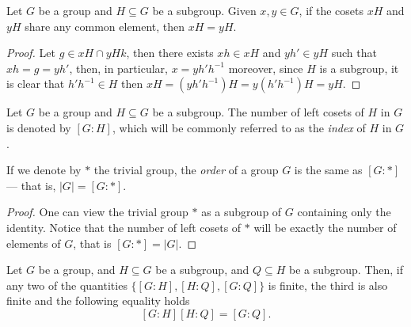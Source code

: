 \begin{corollary}
\label{cor:equal-cosets}
Let \(G\) be a group and \(H \subseteq G\) be a subgroup. Given \(x, y \in G\),
if the cosets \(x H\) and \(y H\) share any common element, then \(x H = y H\).
\end{corollary}

\begin{proof}
Let \(g \in xH \cap yHk\), then there exists \(x h \in xH\) and \(y h' \in yH\)
such that \(x h = g = y h'\), then, in particular, \(x = y h' h^{-1}\) moreover,
since \(H\) is a subgroup, it is clear that \(h' h^{-1} \in H\) then \(x H = (y
h' h^{-1})H = y(h' h^{-1})H = y H\).
\end{proof}

\begin{definition}[Index]
\label{def:grp-index}
Let \(G\) be a group and \(H \subseteq G\) be a subgroup. The number of left
cosets of \(H\) in \(G\) is denoted by \([G \colon H]\), which will be commonly
referred to as the \emph{index} of \(H\) in \(G\).
\end{definition}

\begin{corollary}
\label{cor:order-as-index}
If we denote by \(*\) the trivial group, the \emph{order} of a group
\(G\) is the same as \([G \colon *]\) --- that is, \(|G| = [G \colon *]\).
\end{corollary}

\begin{proof}
One can view the trivial group \(*\) as a subgroup of \(G\) containing only the
identity. Notice that the number of left cosets of \(*\) will be exactly the
number of elements of \(G\), that is \([G \colon *] = |G|\).
\end{proof}

\begin{proposition}
\label{prop:grp-index-subgroup}
Let \(G\) be a group, and \(H \subseteq G\) be a subgroup, and \(Q \subseteq H\)
be a subgroup. Then, if any two of the quantities \(\{[G \colon H], [H \colon
Q], [G \colon Q]\}\) is finite, the third is also finite and the following
equality holds
\[
  [G \colon H] [H \colon Q] = [G \colon Q].
\]
\end{proposition}

